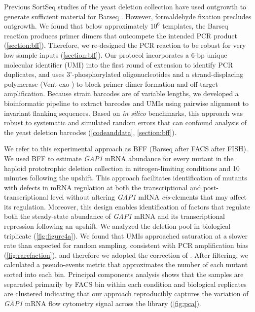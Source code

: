 Previous SortSeq studies of
the yeast deletion collection have used outgrowth 
to generate sufficient material for 
Barseq \parencite{sliva2016barcode}. However, formaldehyde fixation precludes
outgrowth. We found that below approximately $10^6$ templates, the
Barseq reaction produces primer dimers
that outcompete the intended PCR product (\autoref{section:bff}). 
Therefore, we re-designed the
PCR reaction \parencite{robinson2014design,smith2009quantitative} to be robust for
very low sample inputs (\autoref{section:bff}). Our protocol
incorporates a 6-bp unique molecular identifier (UMI) into the first
round of extension to identify PCR duplicates, 
and uses 3’-phosphorylated oligonucleotides and a
strand-displacing polymerase (Vent exo-) to block primer dimer formation and 
off-target amplification. 
Because strain barcodes are of variable lengths, 
we developed a bioinformatic pipeline to extract barcodes and UMIs 
using pairwise alignment to invariant flanking sequences.
Based on \textit{in silico} benchmarks, this
approach was robust to systematic and simulated random errors 
that can confound analysis of the yeast deletion barcodes 
(\autoref{codeanddata}, \autoref{section:bff}). 

We refer to this experimental approach as BFF (Barseq after FACS after FISH). 
We used BFF to estimate \textit{GAP1} mRNA abundance for every mutant in the
haploid prototrophic deletion collection
\parencite{vandersluis2014broad} in
nitrogen-limiting conditions and 10 minutes following the upshift. 
This approach facilitates identification of mutants with
defects in mRNA regulation at both the transcriptional and
post-transcriptional level without altering \textit{GAP1} mRNA 
\textit{cis}-elements that may affect its regulation. 
Moreover, this design enables identification of factors that 
regulate both the steady-state abundance of \textit{GAP1} mRNA and 
its transcriptional repression following an upshift.
We analyzed the deletion pool in biological triplicate
(\autoref{fig:figure4a}). We found that UMIs 
approached saturation at a slower rate than expected for random sampling,
consistent with PCR amplification bias 
(\autoref{fig:rarefaction}), and therefore we adopted the 
correction of \cite{fu2011counting}. After
filtering, we calculated a
pseudo-events metric that approximates the number of each mutant sorted
into each bin. 
Principal components analysis shows that the samples are 
separated primarily by FACS bin within each
condition and biological replicates are clustered indicating that our
approach reproducibly captures the variation of  \textit{GAP1} mRNA flow
cytometry signal across the library (\autoref{fig:pca}). 

